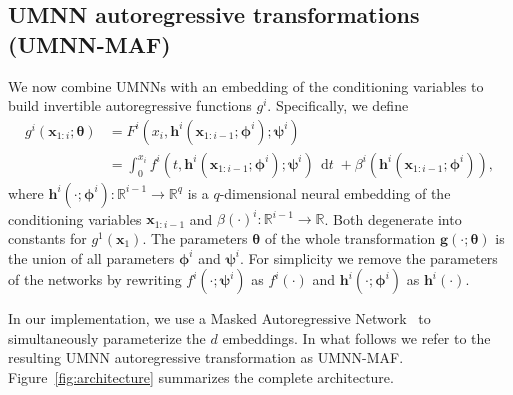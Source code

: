 \documentclass{article}
\newcommand{\mb}{\boldsymbol}
\newcommand{\mbb}{\mathbb}
\DeclareMathOperator{\dt}{\, \mathrm{d}\mathit{t}}
\begin{document}
\subsection{UMNN autoregressive transformations (UMNN-MAF)} \label{sec:UMNN-MAF}

We now combine UMNNs with an embedding of the conditioning variables to build invertible autoregressive functions $g^i$. Specifically, we define
\begin{align}
    g^i(\mb{x}_{1 : i}; \mb{\theta}) &= F^i(x_i, \mb{h}^i(\mb{x}_{1 : i-1}; \mb{\phi}^i); \mb{\psi}^i)\nonumber\\
    &= \int^{x_i}_0 f^i(t, \mb{h}^i(\mb{x}_{1 : i-1}; \mb{\phi}^i); \mb{\psi}^i) \dt + \beta^i(\mb{h}^i(\mb{x}_{1 : i-1}; \mb{\phi}^i)),\label{eq:umnn}
\end{align}
where $\mb{h}^i(\cdot; \mb{\phi}^i): \mbb{R}^{i-1} \rightarrow \mbb{R}^{q}$ is a $q$-dimensional neural embedding of the conditioning variables $\mb{x}_{1:i-1}$ and $\beta(\cdot)^i: \mbb{R}^{i-1} \rightarrow \mbb{R}$. Both degenerate into constants for $g^1(\mb{x}_{1})$. The parameters $\mb{\theta}$ of the whole transformation $\mb{g}(\cdot; \mb{\theta})$ is the union of all parameters $\mb{\phi}^i$ and $\mb{\psi}^i$.
For simplicity we remove the parameters of the networks by rewriting $f^i(\cdot; \mb{\psi}^i)$ as $f^i(\cdot)$ and $\mb{h}^i(\cdot; \mb{\phi}^i)$ as $\mb{h}^i(\cdot)$.

In our implementation, we use a Masked Autoregressive Network~\citep{MADE, IAF, MAF} to simultaneously parameterize the $d$ embeddings. In what follows we refer to the resulting UMNN autoregressive transformation as UMNN-MAF.
Figure~\ref{fig:architecture} summarizes the complete architecture.
\end{document}
